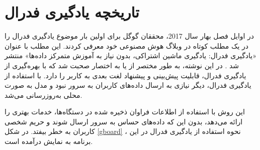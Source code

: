 


\section{تاریخچه یادگیری فدرال}


در اوایل فصل بهار سال 2017، محققان گوگل
برای اولین بار موضوع یادگیری فدرال را در یک مطلب کوتاه در وبلاگ هوش مصنوعی خود معرفی کردند. این مطلب با عنوان «یادگیری فدرال: یادگیری ماشین اشتراکی، بدون نیاز به آموزش متمرکز داده‌ها» منتشر شد
\cite{mcmahan2017federated}.
در این نوشته، به طور مختصر از
یا به اختصار
صحبت شد که با بهره‌گیری از یادگیری فدرال، قابلیت پیش‌بینی و پیشنهاد لغت بعدی به کاربر را دارد. با استفاده از یادگیری فدرال، دیگر نیازی به ارسال داده‌های کاربران به سرور نبود و مدل به ‌صورت محلی به‌روزرسانی می‌شد.

این روش با استفاده از اطلاعات فراوان ذخیره شده در دستگاه‌ها، خدمات بهتری را ارائه می‌دهد، بدون این که داده‌های حساس به سرور ارسال شوند و حریم شخصی کاربران به خطر بیفتد. در شکل
\ref{gboard}%
، نحوه استفاده از یادگیری فدرال در این برنامه به نمایش درآمده است.



